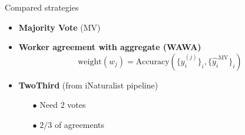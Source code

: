 \begin{frame}{Compared strategies}{}
    \begin{itemize}
        \item<1-> \textbf{Majority Vote} (MV)
        \item<2-> \textbf{Worker agreement with aggregate (WAWA)}
        \[    \mathrm{weight}(w_j) = \mathrm{Accuracy}(\{y_i^{(j)}\}_i, \{\hat {y_i}^\mathrm{MV}\}_i)
        \]
        \item<3-> \textbf{TwoThird} (from iNaturalist pipeline)
        \begin{itemize}
            \item[$\bullet$] Need 2 votes
            \item[$\bullet$] $2/3$ of agreements
        \end{itemize}
    \end{itemize}
\end{frame}

